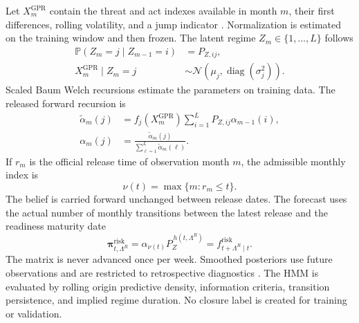 \documentclass[a4paper,fleqn]{cas-sc}
\newcommand{\Prob}{\mathbb{P}}          %
\newcommand{\diag}{\operatorname{diag}}
\begin{document}
Let $X_m^{\mathrm{GPR}}$ contain the threat and act indexes available in month
$m$, their first differences, rolling volatility, and a jump indicator
\citep{CaldaraIacoviello2022}. Normalization is estimated on the training
window and then frozen. The latent regime $Z_m\in\{1,\ldots,L\}$ follows
\begin{subequations}\label{eq:hmm}
\begin{align}
 \Prob(Z_m=j\mid Z_{m-1}=i)&=P_{Z,ij},\\
 X_m^{\mathrm{GPR}}\mid Z_m=j&\sim
 \mathcal N(\mu_j,\diag(\sigma_j^2)).
\end{align}
\end{subequations}
Scaled Baum Welch recursions estimate the parameters on training data. The
released forward recursion is
\begin{subequations}\label{eq:hmm-filter}
\begin{align}
 \widetilde\alpha_m(j)&=f_j(X_m^{\mathrm{GPR}})
 \sum_{i=1}^{L}P_{Z,ij}\alpha_{m-1}(i),\\
 \alpha_m(j)&=\frac{\widetilde\alpha_m(j)}
 {\sum_{\ell=1}^{L}\widetilde\alpha_m(\ell)}.
\end{align}
\end{subequations}
If $r_m$ is the official release time of observation month $m$, the admissible
monthly index is
\begin{equation}
 \nu(t)=\max\{m:r_m\le t\}.
 \label{eq:weekly-release-clock}
\end{equation}
The belief is carried forward unchanged between release dates. The forecast
uses the actual number of monthly transitions between the latest release and
the readiness maturity date
\begin{equation}
 \boldsymbol\pi^{\mathrm{risk}}_{t,\Lambda^R}
 =\alpha_{\nu(t)}P_Z^{\,h(t,\Lambda^R)}
 =f^{\mathrm{risk}}_{t+\Lambda^R\mid t}.
 \label{eq:hmm-forecast-interface}
\end{equation}
The matrix is never advanced once per week. Smoothed posteriors use future
observations and are restricted to retrospective diagnostics
\citep{Rabiner1989,QiIshak2014}. The HMM is evaluated by rolling origin
predictive density, information criteria, transition persistence, and implied
regime duration. No closure label is created for training or validation.
\end{document}
